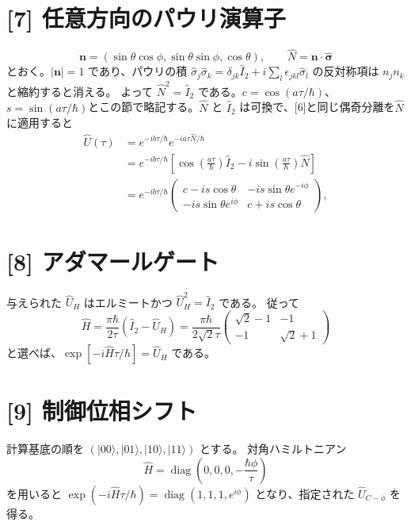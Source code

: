 \documentclass[11pt,a4paper]{article}
\begin{document}
\section*{[7] 任意方向のパウリ演算子}
\[
 \boldsymbol n=(\sin\theta\cos\phi,\sin\theta\sin\phi,\cos\theta),
 \qquad \hat N=\boldsymbol n\cdot\hat{\boldsymbol\sigma}
\]
とおく。$|\boldsymbol n|=1$ であり、パウリの積
$\hat\sigma_j\hat\sigma_k=\delta_{jk}\hat I_2+
i\sum_l\epsilon_{jkl}\hat\sigma_l$ の反対称項は $n_jn_k$ と縮約すると消える。
よって $\hat N^2=\hat I_2$ である。$c=\cos(a\tau/\hbar)$、$s=\sin(a\tau/\hbar)$とこの節で略記する。$\hat N$ と $\hat I_2$ は可換で、[6]と同じ偶奇分離を$\hat N$に適用すると
\begin{align}
 \hat U(\tau)
 &=e^{-ib\tau/\hbar}
   e^{-ia\tau\hat N/\hbar}\\
 &=e^{-ib\tau/\hbar}
   \left[\cos\!\left(\frac{a\tau}{\hbar}\right)\hat I_2
   -i\sin\!\left(\frac{a\tau}{\hbar}\right)\hat N\right]\\
 &=e^{-ib\tau/\hbar}
 \begin{pmatrix}
  c-is\cos\theta&-is\sin\theta e^{-i\phi}\\
  -is\sin\theta e^{i\phi}&c+is\cos\theta
 \end{pmatrix},
 \label{eq:general-pauli-U}
\end{align}


\section*{[8] アダマールゲート}
与えられた $\hat U_H$ はエルミートかつ $\hat U_H^2=\hat I_2$ である。
従って
\begin{equation}
 \hat H=\frac{\pi\hbar}{2\tau}(\hat I_2-\hat U_H)
 =\frac{\pi\hbar}{2\sqrt2\tau}
 \begin{pmatrix}\sqrt2-1&-1\\-1&\sqrt2+1\end{pmatrix}
\end{equation}
と選べば、$\exp[-i\hat H\tau/\hbar]=\hat U_H$ である。

\section*{[9] 制御位相シフト}
計算基底の順を $(|00\rangle,|01\rangle,|10\rangle,|11\rangle)$ とする。
対角ハミルトニアン
\begin{equation}
 \hat H=\operatorname{diag}
 \left(0,0,0,-\frac{\hbar\phi}{\tau}\right)
\end{equation}
を用いると
$\exp(-i\hat H\tau/\hbar)=\operatorname{diag}(1,1,1,e^{i\phi})$
となり、指定された $\hat U_{C-\phi}$ を得る。
\end{document}
